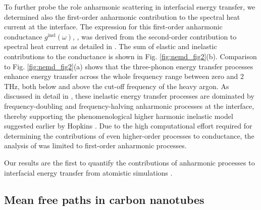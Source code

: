 To further probe the role anharmonic scattering in interfacial energy transfer, we determined also the first-order anharmonic contribution to the spectral heat current at the interface. The expression for this first-order anharmonic conductance $g^{\textrm{inel}}(\omega)$, , was derived from the second-order contribution to spectral heat current as detailed in . The sum of elastic and inelastic contributions to the conductance is shown in Fig. \ref{fig:nemd_fig2}(b). Comparison to Fig. \ref{fig:nemd_fig2}(a) shows that the three-phonon energy transfer processes enhance energy transfer across the whole frequency range between zero and 2 THz, both below and above the cut-off frequency of the heavy argon. As discussed in detail in , these inelastic energy transfer processes are dominated by frequency-doubling and frequency-halving anharmonic processes at the interface, thereby supporting the phenomenological higher harmonic inelastic model suggested earlier by Hopkins \cite{hopkins09_jap}. Due to the high computational effort required for determining the contributions of even higher-order processes to conductance, the analysis of  was limited to first-order anharmonic processes.

Our results are the first to quantify the contributions of anharmonic processes to interfacial energy transfer from atomistic simulations . 

\subsection{Mean free paths in carbon nanotubes}

\label{sec:results_mfps}

